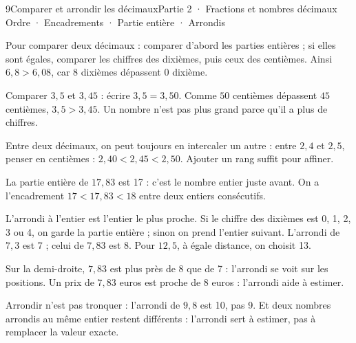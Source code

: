 \begin{ouverture}[calcul]{9}{Comparer et arrondir les décimaux}{Partie 2 · Fractions et nombres décimaux}
{Ordre · Encadrements · Partie entière · Arrondis}
\end{ouverture}
\pagestyle{otMain}\essentiel\fontsize{11}{15}\selectfont
{}\label{cours-9-1}
\begin{propriete}Pour comparer deux décimaux : comparer d’abord les parties entières ; si elles sont égales, comparer les chiffres des dixièmes, puis ceux des centièmes. Ainsi $6{,}8>6{,}08$, car 8 dixièmes dépassent 0 dixième.\end{propriete}
\begin{exemple}Comparer $3{,}5$ et $3{,}45$ : écrire $3{,}5=3{,}50$. Comme $50$ centièmes dépassent $45$ centièmes, $3{,}5>3{,}45$. Un nombre n’est pas plus grand parce qu’il a plus de chiffres.\end{exemple}
\label{fig-cours-9-1-cours-droite-decimaux}

\begin{savoirfaire}Entre deux décimaux, on peut toujours en intercaler un autre : entre $2{,}4$ et $2{,}5$, penser en centièmes : $2{,}40<2{,}45<2{,}50$. Ajouter un rang suffit pour affiner.\end{savoirfaire}
\clearpage
{}\label{cours-9-2}
\begin{definition}La partie entière de $17{,}83$ est 17 : c’est le nombre entier juste avant. On a l’encadrement $17<17{,}83<18$ entre deux entiers consécutifs.\end{definition}
\begin{propriete}L’arrondi à l’entier est l’entier le plus proche. Si le chiffre des dixièmes est 0, 1, 2, 3 ou 4, on garde la partie entière ; sinon on prend l’entier suivant. L’arrondi de $7{,}3$ est 7 ; celui de $7{,}83$ est 8. Pour $12{,}5$, à égale distance, on choisit 13.\end{propriete}
\begin{exemple}Sur la demi-droite, $7{,}83$ est plus près de 8 que de 7 : l’arrondi se voit sur les positions. Un prix de $7{,}83$ euros est proche de 8 euros : l’arrondi aide à estimer.\end{exemple}
\begin{attention}Arrondir n’est pas tronquer : l’arrondi de $9{,}8$ est 10, pas 9. Et deux nombres arrondis au même entier restent différents : l’arrondi sert à estimer, pas à remplacer la valeur exacte.\end{attention}

